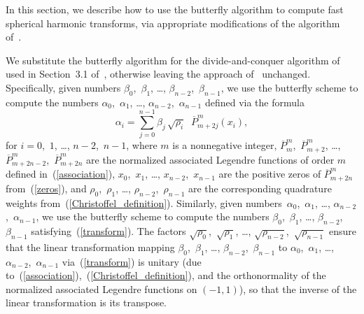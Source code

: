 \documentclass[final,3p,times]{elsarticle}
\begin{document}
In this section, we describe how to use the butterfly algorithm
to compute fast spherical harmonic transforms,
via appropriate modifications of the algorithm of~\cite{tygert_sph}.


We substitute the butterfly algorithm for the divide-and-conquer algorithm
of~\cite{gu-eisenstat95} used in Section~3.1 of~\cite{tygert_sph},
otherwise leaving the approach of~\cite{tygert_sph} unchanged. Specifically,
given numbers $\beta_0$,~$\beta_1$, \dots, $\beta_{n-2}$,~$\beta_{n-1}$,
we use the butterfly scheme to compute the numbers
$\alpha_0$,~$\alpha_1$, \dots, $\alpha_{n-2}$,~$\alpha_{n-1}$ defined
via the formula
\begin{equation}
\label{transform}
\alpha_i
= \sum_{j=0}^{n-1} \beta_j \, \sqrt{\rho_i} \;\; \overline{P}^m_{m+2j}(x_i),
\end{equation}
for $i = 0$,~$1$, \dots, $n-2$,~$n-1$,
where $m$ is a nonnegative integer,
$\overline{P}^m_m$,~$\overline{P}^m_{m+2}$, \dots,
$\overline{P}^m_{m+2n-2}$,~$\overline{P}^m_{m+2n}$
are the normalized associated Legendre functions of order $m$ defined
in~(\ref{association}),
$x_0$,~$x_1$, \dots, $x_{n-2}$,~$x_{n-1}$ are the positive zeros
of $\overline{P}^m_{m+2n}$ from~(\ref{zeros}),
and $\rho_0$,~$\rho_1$, \dots, $\rho_{n-2}$,~$\rho_{n-1}$
are the corresponding quadrature weights from~(\ref{Christoffel_definition}).
Similarly,
given numbers~$\alpha_0$,~$\alpha_1$, \dots, $\alpha_{n-2}$,~$\alpha_{n-1}$,
we use the butterfly scheme to compute the numbers
$\beta_0$,~$\beta_1$, \dots, $\beta_{n-2}$,~$\beta_{n-1}$
satisfying~(\ref{transform}).
The factors $\sqrt{\rho_0}$,~$\sqrt{\rho_1}$, \dots,
$\sqrt{\rho_{n-2}}$,~$\sqrt{\rho_{n-1}}$ ensure that the linear transformation
mapping $\beta_0$,~$\beta_1$, \dots, $\beta_{n-2}$,~$\beta_{n-1}$
to $\alpha_0$,~$\alpha_1$, \dots, $\alpha_{n-2}$,~$\alpha_{n-1}$
via~(\ref{transform}) is unitary
(due to~(\ref{association}),~(\ref{Christoffel_definition}),
and the orthonormality of the normalized associated Legendre functions
on $(-1,1)$), so that the inverse of the linear transformation
is its transpose.
\end{document}
